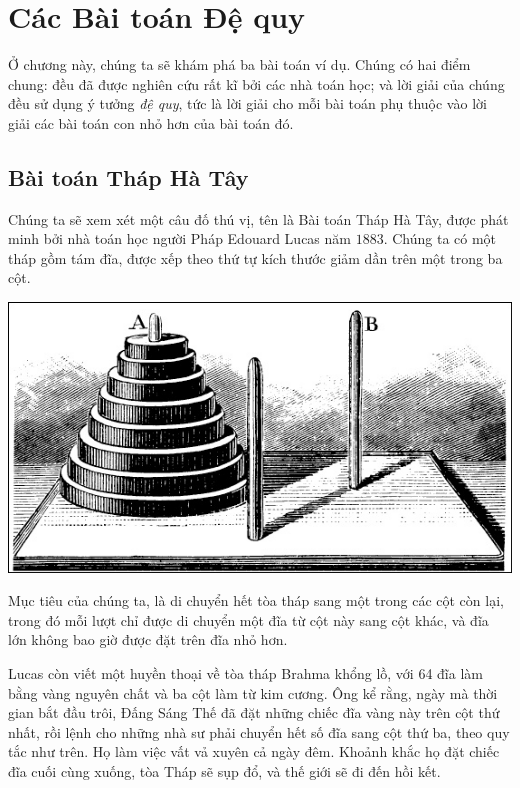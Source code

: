 \chapter{Các Bài toán Đệ quy}\label{ch:1}

Ở chương này, chúng ta sẽ khám phá ba bài toán ví dụ.
Chúng có hai điểm chung:
đều đã được nghiên cứu rất kĩ bởi các nhà toán học;
và lời giải của chúng đều sử dụng ý tưởng \textit{đệ quy}, tức là lời giải cho mỗi bài toán phụ thuộc vào lời giải các bài toán con nhỏ hơn của bài toán đó.

\section{Bài toán Tháp Hà Tây}\label{sec:1.1}


Chúng ta sẽ xem xét một câu đố thú vị, tên là Bài toán Tháp Hà Tây, được phát minh bởi nhà toán học người Pháp Edouard Lucas năm $1883$.
Chúng ta có một tháp gồm tám đĩa, được xếp theo thứ tự kích thước giảm dần trên một trong ba cột.

\begin{center}
    \includegraphics[width=.5\textwidth]{assets/chapter1/Tower of Hanoi}
\end{center}

Mục tiêu của chúng ta, là di chuyển hết tòa tháp sang một trong các cột còn lại, trong đó mỗi lượt chỉ được di chuyển một đĩa từ cột này sang cột khác, và đĩa lớn không bao giờ được đặt trên đĩa nhỏ hơn.

Lucas còn viết một huyền thoại về tòa tháp Brahma khổng lồ, với 64 đĩa làm bằng vàng nguyên chất và ba cột làm từ kim cương.
Ông kể rằng, ngày mà thời gian bắt đầu trôi, Đấng Sáng Thế đã đặt những chiếc đĩa vàng này trên cột thứ nhất, rồi lệnh cho những nhà sư phải chuyển hết số đĩa sang cột thứ ba, theo quy tắc như trên.
Họ làm việc vất vả xuyên cả ngày đêm.
Khoảnh khắc họ đặt chiếc đĩa cuối cùng xuống, tòa Tháp sẽ sụp đổ, và thế giới sẽ đi đến hồi kết.

